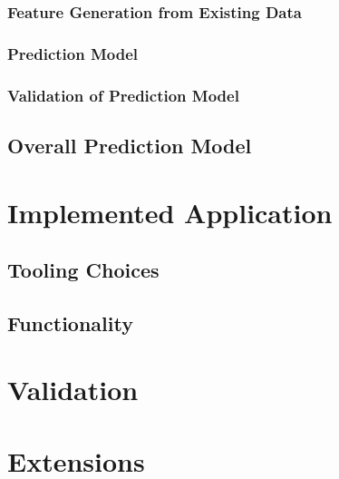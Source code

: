 \documentclass[%
a4paper,
DIV12,
2.5headlines,
bigheadings,
titlepage,
openbib,
]{scrartcl}
\begin{document}
\subsubsection{Feature Generation from Existing
Data}\label{feature-generation-from-existing-data-1}



\subsubsection{Prediction Model}\label{prediction-model-2}



\subsubsection{Validation of Prediction
Model}\label{validation-of-prediction-model-2}



\subsection{Overall Prediction Model}\label{overall-prediction-model}



\section{Implemented Application}\label{implemented-application}
\subsection{Tooling Choices}\label{tooling-choices}



\subsection{Functionality}\label{functionality}



\section{Validation}\label{validation}



\section{Extensions}\label{extensions}
\end{document}
